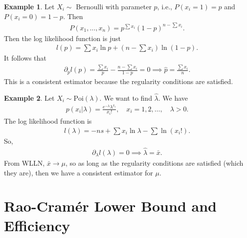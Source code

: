 \documentclass{book}
\theoremstyle{definition}
\newtheorem{exmp}{Example}[section]
\newcommand{\p}{\partial}
\newcommand{\f}[2]{\frac{#1}{#2}}
\newcommand{\lp}{\left(}
\newcommand{\rp}{\right)}
\begin{document}
\begin{exmp}
	Let $X_i \sim $ Bernoulli with parameter $p$, i.e., $P(x_i = 1) = p$ and $P(x_i = 0) = 1-p$. Then 
	\begin{align}
	P(x_1,\dots,x_n) = p^{\sum x_i}(1-p)^{n-\sum x_i}.
	\end{align}
	Then the log likelihood function is just
	\begin{align}
	l(p) = \sum x_i \ln p + \lp n - \sum x_i \rp \ln (1-p).
	\end{align}
	It follows that
	\begin{align}
	\p_p l(p) = \f{\sum x_i}{p} - \f{n - \sum x_i}{1-p} = 0\implies \hat{p} = \f{\sum x_i}{n}.
	\end{align}
	This is a consistent estimator because the regularity conditions are satisfied. 

	
	
\end{exmp}












\begin{exmp}
	Let $X_i \sim \text{Poi}(\lambda)$. We want to find $\hat\lambda$. We have
	\begin{align}
	p(x_i \vert \lambda) = \f{e^{-\lambda} \lambda^{x_i}}{x_i!}, \quad x_i = 1,2,\dots, \quad \lambda > 0.
	\end{align}
	The log likelihood function is 
	\begin{align}
	l(\lambda) = -ns + \sum x_i \ln \lambda - \sum \ln (x_i!).
	\end{align}
	So,
	\begin{align}
	\p_\lambda l(\lambda) = 0 \implies \hat\lambda = \bar{x}.
	\end{align}
	From WLLN, $\bar{x} \to \mu$, so as long as the regularity conditions are satisfied (which they are), then we have a consistent estimator for $\mu$. 
	
	
	
	
	
	
\end{exmp}






\section{Rao-Cram\'er Lower Bound and Efficiency}
\end{document}
